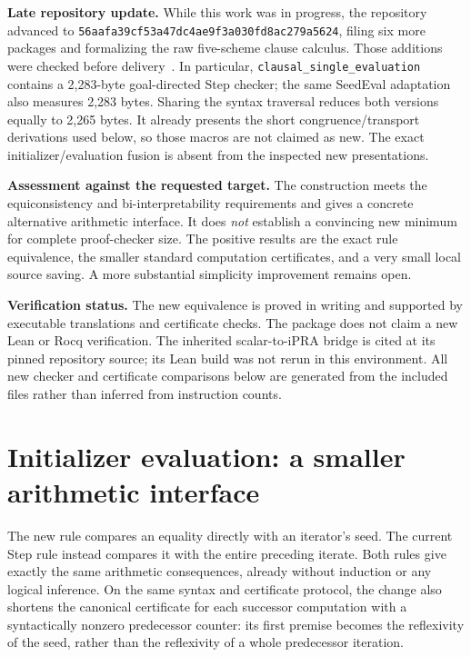 \documentclass[11pt,letterpaper]{article}
\newcommand{\file}[1]{\nolinkurl{#1}}
\begin{document}
\textbf{Late repository update.}
While this work was in progress, the repository advanced to
\texttt{56aafa39cf53a47dc4ae9f3a030fd8ac279a5624}, filing six more
packages and formalizing the raw five-scheme clause calculus. Those
additions were checked before delivery~\cite{latest}. In particular,
\file{clausal_single_evaluation} contains a 2,283-byte goal-directed Step
checker; the same SeedEval adaptation also measures 2,283 bytes.
Sharing the syntax traversal reduces both versions equally to 2,265 bytes.
It already presents the short congruence/transport derivations used below,
so those macros are not claimed as new. The exact initializer/evaluation
fusion is absent from the inspected new presentations.

\textbf{Assessment against the requested target.}
The construction meets the equiconsistency and bi-interpretability
requirements and gives a concrete alternative arithmetic interface.
It does \emph{not} establish a convincing new minimum for complete
proof-checker size. The positive results are the exact rule equivalence,
the smaller standard computation certificates, and a very small local
source saving. A more substantial simplicity improvement remains open.

\textbf{Verification status.}
The new equivalence is proved in writing and supported by executable
translations and certificate checks. The package does not claim a new
Lean or Rocq verification. The inherited scalar-to-iPRA bridge is cited
at its pinned repository source; its Lean build was not rerun in this
environment. All new checker and certificate comparisons below are generated
from the included files rather than inferred from instruction counts.

\setcounter{tocdepth}{1}
{\small\setlength{\parskip}{0pt}\tableofcontents}
\clearpage


\section{Initializer evaluation: a smaller arithmetic interface}

The new rule compares an equality directly with an iterator's seed.
The current Step rule instead compares it with the entire preceding
iterate.  Both rules give exactly the same arithmetic consequences,
already without induction or any logical inference.  On the same
syntax and certificate protocol, the change also shortens the canonical
certificate for each successor computation with a syntactically nonzero
predecessor counter: its first premise becomes
the reflexivity of the seed, rather than the reflexivity of a whole
predecessor iteration.
\end{document}
